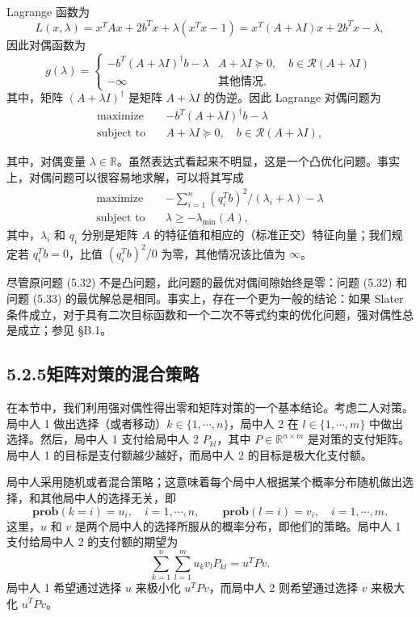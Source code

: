 \documentclass[UTF8, 12pt, fontset=fandol, oneside]{ctexart}
\begin{document}
Lagrange 函数为
\[
L(x,\lambda)=x^TAx+2b^Tx+\lambda(x^Tx-1)=x^T(A+\lambda I)x+2b^Tx-\lambda,
\]
因此对偶函数为
\[
g(\lambda)=
\begin{cases}
-b^T(A+\lambda I)^\dagger b-\lambda & A+\lambda I\succeq 0,\quad b\in\mathcal{R}(A+\lambda I)\\
-\infty & \text{其他情况},
\end{cases}
\]
其中，矩阵 $(A+\lambda I)^\dagger$ 是矩阵 $A+\lambda I$ 的伪逆。因此 Lagrange 对偶问题为
\begin{equation}
\begin{aligned}
\text{maximize}\quad & -b^T(A+\lambda I)^\dagger b-\lambda\\
\text{subject to}\quad & A+\lambda I\succeq 0,\quad b\in\mathcal{R}(A+\lambda I),
\end{aligned}
\tag{5.33}
\end{equation}

其中，对偶变量 $\lambda\in\mathbb{R}$。虽然表达式看起来不明显，这是一个凸优化问题。事实上，对偶问题可以很容易地求解，可以将其写成
\[
\begin{aligned}
\text{maximize}\quad & -\sum_{i=1}^n (q_i^Tb)^2/(\lambda_i+\lambda)-\lambda\\
\text{subject to}\quad & \lambda\geq -\lambda_{\min}(A),
\end{aligned}
\]
其中，$\lambda_i$ 和 $q_i$ 分别是矩阵 $A$ 的特征值和相应的（标准正交）特征向量；我们规定若 $q_i^Tb=0$，比值 $(q_i^Tb)^2/0$ 为零，其他情况该比值为 $\infty$。

尽管原问题 (5.32) 不是凸问题，此问题的最优对偶间隙始终是零：问题 (5.32) 和问题 (5.33) 的最优解总是相同。事实上，存在一个更为一般的结论：如果 Slater 条件成立，对于具有二次目标函数和一个二次不等式约束的优化问题，强对偶性总是成立；参见 §B.1。

\subsection*{5.2.5\quad 矩阵对策的混合策略}

在本节中，我们利用强对偶性得出零和矩阵对策的一个基本结论。考虑二人对策。局中人 1 做出选择（或者移动）$k\in\{1,\cdots,n\}$，局中人 2 在 $l\in\{1,\cdots,m\}$ 中做出选择。然后，局中人 1 支付给局中人 2 $P_{kl}$，其中 $P\in\mathbb{R}^{n\times m}$ 是对策的支付矩阵。局中人 1 的目标是支付额越少越好，而局中人 2 的目标是极大化支付额。

局中人采用随机或者混合策略；这意味着每个局中人根据某个概率分布随机做出选择，和其他局中人的选择无关，即
\[
\mathbf{prob}(k=i)=u_i,\quad i=1,\cdots,n,\qquad
\mathbf{prob}(l=i)=v_i,\quad i=1,\cdots,m.
\]
这里，$u$ 和 $v$ 是两个局中人的选择所服从的概率分布，即他们的策略。局中人 1 支付给局中人 2 的支付额的期望为
\[
\sum_{k=1}^n\sum_{l=1}^m u_kv_lP_{kl}=u^TPv.
\]
局中人 1 希望通过选择 $u$ 来极小化 $u^TPv$，而局中人 2 则希望通过选择 $v$ 来极大化 $u^TPv$。
\end{document}
